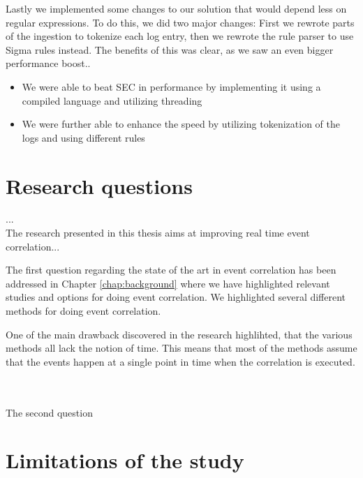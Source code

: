 Lastly we implemented some changes to our solution that would depend less on regular expressions. To do this, we did two major changes: First we rewrote parts of the ingestion to tokenize each log entry, then we rewrote the rule parser to use Sigma rules instead. The benefits of this was clear, as we saw an even bigger performance boost..


\iffalse
high signal low noise
1000 = 40.17%
10 000 = 34.19%
100 000 = 22.78%
1 000 000 = 20.5%

baseline
1000 = 89.5%
10 000 = 135.7%
100 000 = 127%
1 000 000 = 101.1%
\fi

\begin{itemize}
    \item We were able to beat SEC in performance by implementing it using a compiled language and utilizing threading
    \item We were further able to enhance the speed by utilizing tokenization of the logs and using different rules
\end{itemize}


\section{Research questions}
...\\
The research presented in this thesis aims at improving real time event correlation...


The first question regarding the state of the art in event correlation has been addressed in Chapter \cref{chap:background} where we have highlighted relevant studies and options for doing event correlation. We highlighted several different methods for doing event correlation.

One of the main drawback discovered in the research highlihted, that the various methods all lack the notion of time. This means that most of the methods assume that the events happen at a single point in time when the correlation is executed.


\\
\\
The second question 







\section{Limitations of the study}
\label{sec:limitations}

